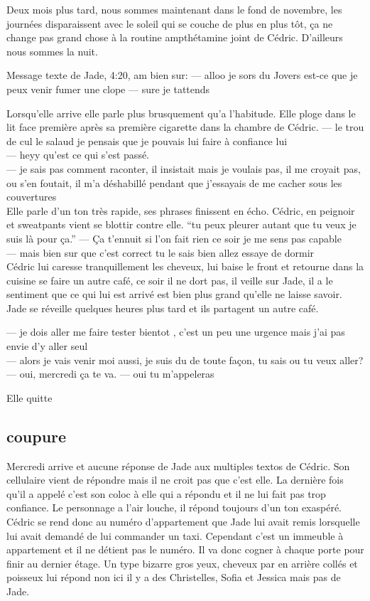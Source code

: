 \documentclass{article}
\begin{document}
Deux mois plus tard, nous sommes maintenant dans le fond de novembre, les journées disparaissent
avec le soleil qui se couche de plus en plus tôt, ça ne change pas grand chose à la routine
ampthétamine joint de Cédric. D'ailleurs nous sommes la nuit.

Message texte de Jade, 4:20, am bien sur:
--- alloo je sors du Jovers est-ce que je peux venir fumer une clope
--- sure je tattends

Lorsqu'elle arrive elle parle plus brusquement qu'a l'habitude. Elle ploge dans le lit face
première après sa première cigarette dans la chambre de Cédric.
--- le trou de cul le salaud je pensais que je pouvais lui faire à confiance lui\\
--- heyy qu'est ce qui s'est passé.\\
--- je sais pas comment raconter, il insistait mais je voulais pas, il me croyait
pas, ou s'en foutait, il m'a déshabillé pendant que j'essayais de me cacher sous les couvertures\\

Elle parle d'un ton très rapide, ses phrases finissent en écho. Cédric, en peignoir et sweatpants
vient se blottir contre elle. ``tu peux pleurer autant que tu veux je suis là pour ça.''
--- Ça t'ennuit si l'on fait rien ce soir je me sens pas capable\\
--- mais bien sur que c'est correct tu le sais bien allez essaye de dormir\\

Cédric lui caresse tranquillement les cheveux, lui baise le front et retourne
dans la cuisine se faire un autre café, ce soir il ne dort pas, il veille sur
Jade, il a le sentiment que ce qui lui est arrivé est bien plus grand qu'elle ne
laisse savoir. Jade se réveille quelques heures plus tard et ils partagent un autre café.

--- je dois aller me faire tester bientot , c'est un peu une urgence mais j'ai pas envie d'y aller seul\\
--- alors je vais venir moi aussi, je suis du de toute façon, tu sais ou tu veux aller?\\
--- oui, mercredi ça te va.
--- oui tu m'appeleras

Elle quitte


\clearpage
\subsection{coupure}


Mercredi arrive et aucune réponse de Jade aux multiples textos de Cédric. Son
cellulaire vient de répondre mais il ne croit pas que c'est elle. La dernière
fois qu'il a appelé c'est son coloc à elle qui a répondu et il ne lui fait pas
trop confiance. Le personnage a l'air louche, il répond toujours d'un ton
exaspéré. Cédric se rend donc au numéro d'appartement que Jade lui avait remis
lorsquelle lui avait demandé de lui commander un taxi. Cependant c'est un
immeuble à appartement et il ne détient pas le numéro. Il va donc cogner à
chaque porte pour finir au dernier étage. Un type bizarre gros yeux, cheveux par
en arrière collés et poisseux lui répond non ici il y a des Christelles, Sofia
et Jessica mais pas de Jade.\\
\end{document}
